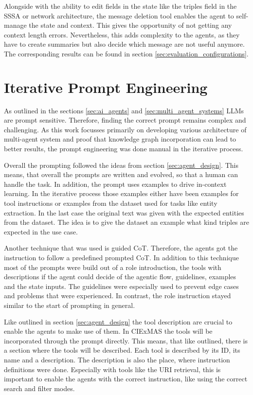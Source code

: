 \documentclass[a4paper,oneside,bibliography=totoc]{scrbook}
\begin{document}
Alongside with the ability to edit fields in the state like the triples field in the \ac{SSSA} or network architecture, the message deletion tool enables the agent to self-manage the state and context. This gives the opportunity of not getting any context length errors. Nevertheless, this adds complexity to the agents, as they have to create summaries but also decide which message are not useful anymore. The corresponding results can be found in section \ref{sec:evaluation_configurations}.

\section{Iterative Prompt Engineering}
\label{sec:iterative_prompt_engineering}

As outlined in the sections \ref{sec:ai_agents} and \ref{sec:multi_agent_systems} \acp{LLM} are prompt sensitive. Therefore, finding the correct prompt remains complex and challenging. As this work focusses primarily on developing various architecture of multi-agent system and proof that knowledge graph incorporation can lead to better results, the prompt engineering was done manual in the iterative process.

Overall the prompting followed the ideas from section \ref{sec:agent_design}. This means, that overall the prompts are written and evolved, so that a human can handle the task. In addition, the prompt uses examples to drive in-context learning. In the iterative process those examples either have been examples for tool instructions or examples from the dataset used for tasks like entity extraction. In the last case the original text was given with the expected entities from the dataset. The idea is to give the dataset an example what kind triples are expected in the use case.

Another technique that was used is guided \ac{CoT}. Therefore, the agents got the instruction to follow a predefined prompted \ac{CoT}. In addition to this technique most of the prompts were build out of a role introduction, the tools with descriptions if the agent could decide of the agentic flow, guidelines, examples and the state inputs. The guidelines were especially used to prevent edge cases and problems that were experienced. In contrast, the role instruction stayed similar to the start of prompting in general.

Like outlined in section \ref{sec:agent_design} the tool description are crucial to enable the agents to make use of them. In CIExMAS the tools will be incorporated through the prompt directly. This means, that like outlined, there is a section where the tools will be described. Each tool is described by its ID, its name and a description. The description is also the place, where instruction definitions were done. Especially with tools like the URI retrieval, this is important to enable the agents with the correct instruction, like using the correct search and filter modes.
\end{document}
